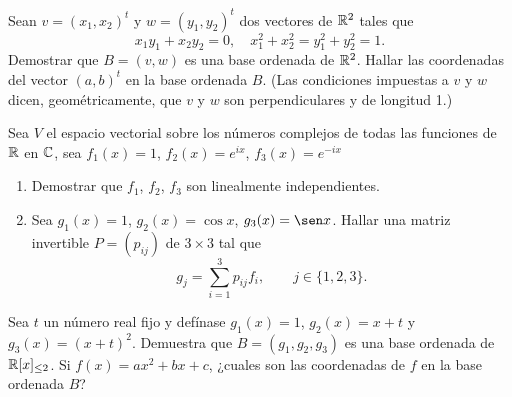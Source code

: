 \begin{exerciselist}
  \item Sean $v = (x_1, x_2)^t$ y $w = (y_1, y_2)^t$ dos vectores de $\mathbb{R}^2$ tales que
    \[ x_1 y_1 + x_2 y_2 = 0, \quad x_1^2 + x_2^2 = y_1^2 + y_2^2 = 1. \]
    Demostrar que $B = (v, w)$ es una base ordenada de $\mathbb{R}^2$. Hallar las coordenadas del vector $(a,b)^t$ en la base ordenada $B$. (Las condiciones impuestas a $v$ y $w$ dicen, geométricamente, que $v$ y $w$ son perpendiculares y de longitud 1.)

  \item Sea $V$ el espacio vectorial sobre los números complejos de todas las funciones de $\mathbb{R}$ en $\mathbb{C}$, sea $f_1(x) = 1$, $f_2(x) = e^{ix}$,  $f_3(x) = e^{-ix}$
    \begin{enumerate}
      \item Demostrar que $f_1$, $f_2$, $f_3$ son linealmente independientes.
      \item Sea $g_1(x)= 1$, $g_2(x) = \cos x$, $g_3(x) = \sen x$. Hallar una matriz invertible $P = (p_{ij})$ de $3 \times 3$ tal que
        \[ g_j = \sum_{i=1}^3 p_{ij} f_i, \qquad j \in \{1, 2, 3\}. \]
    \end{enumerate}

  \item Sea $t$ un número real fijo y defínase $g_1(x) = 1$, $g_2(x) = x+t$ y $g_3(x) = (x+t)^2$. Demuestra que $B = (g_1, g_2, g_3)$ es una base ordenada de $\mathbb{R}[x]_{\leq 2}$. Si $f(x) = ax^2 + bx + c$, ¿cuales son las coordenadas de $f$ en la base ordenada $B$?
\end{exerciselist}